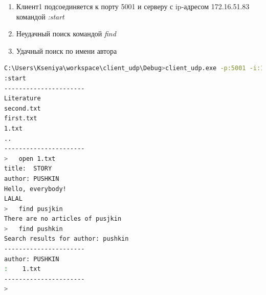 \documentclass[12pt,a4paper]{report}
\begin{document}
\begin{enumerate}
\item Клиент1 подсоединяется к порту 5001 и серверу с ip-адресом 172.16.51.83 командой  \textit{:start}
\item Неудачный поиск командой \textit{find}
\item Удачный поиск по имени автора
\end{enumerate}


\begin{lstlisting}[language=sh]
C:\Users\Kseniya\workspace\client_udp\Debug>client_udp.exe -p:5001 -i:172.16.51.83
:start
----------------------
Literature
second.txt
first.txt
1.txt
..
----------------------
>   open 1.txt
title:  STORY
author: PUSHKIN
Hello, everybody!
LALAL
>   find pusjkin
There are no articles of pusjkin
>   find pushkin
Search results for author: pushkin
----------------------
author: PUSHKIN
:    1.txt
----------------------
>
\end{lstlisting}
\end{document}
